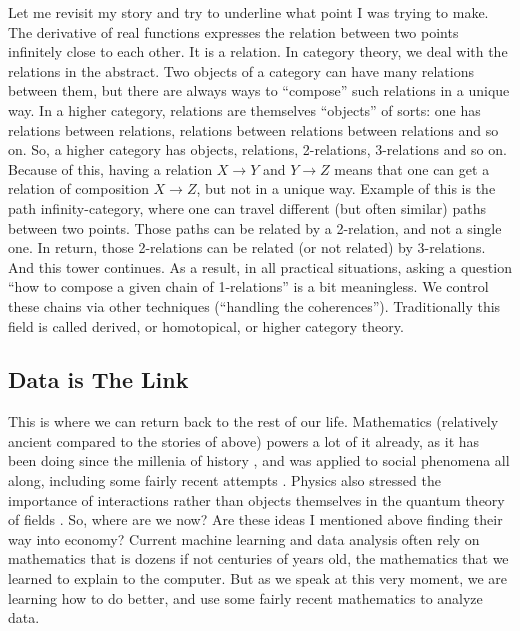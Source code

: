 \documentclass{article}
\begin{document}
Let me revisit my story and try to underline what point I was trying to make. The  derivative of real functions expresses the relation between two points infinitely close to each other. It is a relation. In category theory, we deal with the relations in the abstract. Two objects of a category can have many relations between them, but there are always ways to “compose” such relations in a unique way.
In a higher category, relations are themselves “objects” of sorts: one has relations between relations, relations between relations between relations and so on.
So, a higher category has objects, relations, 2-relations, 3-relations and so on.
Because of this, having a relation  $X \to Y$ and $Y \to Z$ means that one can get a relation of composition $X \to Z$, but not in a unique way. Example of this is the path infinity-category, where one can travel different (but often similar) paths between two points. Those paths can be related by a 2-relation, and not a single one. In return, those 2-relations can be related (or not related) by 3-relations. And this tower continues.
As a result, in all practical situations, asking a question “how to compose a given chain of 1-relations” is a bit meaningless. We control these chains via other techniques (“handling the coherences”). Traditionally this field is called derived, or homotopical, or higher category theory.

\subsection*{Data is The Link}

This is where we can return back to the rest of our life. Mathematics (relatively ancient compared to the stories of above) powers a lot of it already, as it has been doing since the millenia of history \cite{CHILDE}, and was applied to social phenomena all along, including some fairly recent attempts \cite{MORAVA}. Physics also stressed the importance of interactions rather than objects themselves in the quantum theory of fields \cite{WEINBERG}. So, where are we now? Are these ideas I mentioned above finding their way into economy?
Current machine learning and data analysis often rely on mathematics that is dozens if not centuries of years old, the mathematics that we learned to explain to the computer. But as we speak at this very moment, we are learning how to do better, and use some fairly recent mathematics to analyze data.
\end{document}
